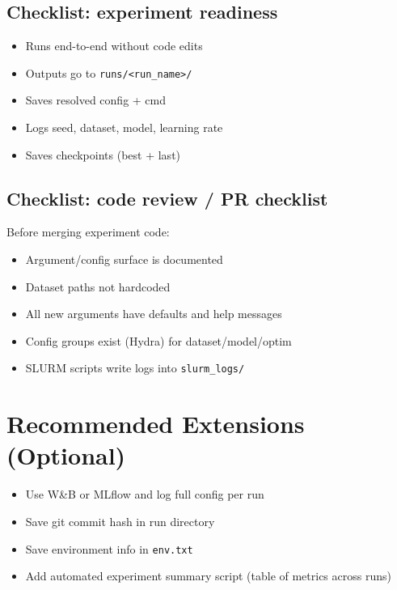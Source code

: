 \documentclass[11pt]{article}
\begin{document}
\subsection{Checklist: experiment readiness}
\begin{itemize}
    \item Runs end-to-end without code edits
    \item Outputs go to \texttt{runs/<run\_name>/}
    \item Saves resolved config + cmd
    \item Logs seed, dataset, model, learning rate
    \item Saves checkpoints (best + last)
\end{itemize}

\subsection{Checklist: code review / PR checklist}
Before merging experiment code:
\begin{itemize}
    \item Argument/config surface is documented
    \item Dataset paths not hardcoded
    \item All new arguments have defaults and help messages
    \item Config groups exist (Hydra) for dataset/model/optim
    \item SLURM scripts write logs into \texttt{slurm\_logs/}
\end{itemize}

\section{Recommended Extensions (Optional)}
\begin{itemize}
    \item Use W\&B or MLflow and log full config per run
    \item Save git commit hash in run directory
    \item Save environment info in \texttt{env.txt}
    \item Add automated experiment summary script (table of metrics across runs)
\end{itemize}
\end{document}
